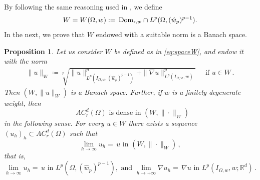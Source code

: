 \documentclass[11pt,leqno]{amsart}
\newtheorem{prop}[teo]{Proposition}
\theoremstyle{remark}
\theoremstyle{definition}
\theoremstyle{definition}
\newcommand{\wstar}{{\hat w}}
\begin{document}
By following the same reasoning used in \cite{CCMH1}, we define 
\begin{align}
\label{eq:spaceW}
W=W(\Omega, w):=\,{\rm{Dom}}_{{\mathrm r},w}\cap L^{p}(\Omega,(\wstar_{p})^{p-1}).
\end{align}
In the next, we prove that $W$ endowed with a suitable norm is a Banach space.
\begin{prop} 
Let us consider $W$ be defined as in \eqref{eq:spaceW}, and endow it with the norm
\begin{align}\label{normapp}
\|u\|_W\coloneqq \sqrt[p]{\|u\|_{L^{p}(I_{\Omega,w},(\wstar_{p})^{p-1})}^{p}+\|\nabla u\|_{L^{p}(I_{\Omega,w},w)}^{p}}\quad\text{ if }u\in W\,.
\end{align}
Then $(W,\|u\|_W)$ is a Banach space. Further, if $w$ is a finitely degenerate weight, then
\begin{equation}\label{LipdenseW}
\text{ $AC_{r}^{d}(\Omega)$ is dense in $(W,\|\cdot\|_W)$} 
\end{equation}
in the following sense. For every $u\in W$ there exists a sequence $(u_h)_h\subset AC_{r}^{d}(\Omega)$ such that
\begin{equation*}\label{approxseqW}
\lim_{h\to\infty}u_h=\,u \text{ in } (W,\|\cdot\|_W)\,,
\end{equation*}
that is,
\begin{equation}\label{convinWsplitted}
\lim_{h\to\infty}u_h=\,u \text{ in } L^{p}(\Omega,(\wstar_{p})^{p-1}),\text{ and }\lim_{h\to+\infty}\nabla u_h=\,\nabla u \text{ in } L^{p}(I_{\Omega,w},w;\mathbb{R}^d)\,.
\end{equation}
\end{prop}
\end{document}
